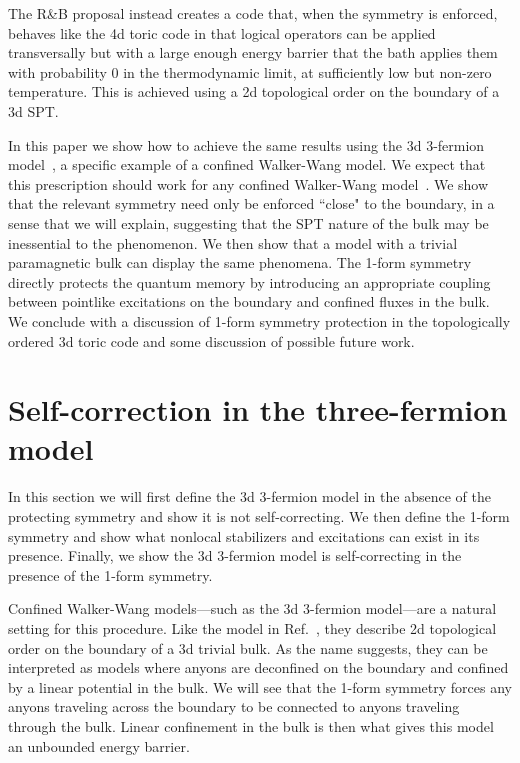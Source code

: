 \documentclass[twocolumn, longbibliography]{revtex4-2}
\begin{document}
The R\&B proposal \cite{RobertsBartlett} instead creates a code that, when the symmetry is enforced, behaves like the 4d toric code in that logical operators can be applied transversally but with a large enough energy barrier that the bath applies them with probability 0 in the thermodynamic limit, at sufficiently low but non-zero temperature. This is achieved using a 2d topological order on the boundary of a 3d SPT. 
	
In this paper we show how to achieve the same results using the 3d 3-fermion model~\cite{BurnellSoluble}, a specific example of a confined Walker-Wang model. We expect that this prescription should work for any confined Walker-Wang model~\cite{WalkerWang, vonKeyserlingkSurfaceAnyons}. We show that the relevant symmetry need only be enforced ``close" to the boundary, in a sense that we will explain, suggesting that the SPT nature of the bulk may be inessential to the phenomenon. 
We then show that a model with a trivial paramagnetic bulk can display the same phenomena. The 1-form symmetry directly protects the quantum memory by introducing an appropriate coupling between pointlike excitations on the boundary and confined fluxes in the bulk. 
We conclude with a discussion of 1-form symmetry protection in the topologically ordered 3d toric code and some discussion of possible future work.

\section{Self-correction in the three-fermion model}
	
In this section we will first define the 3d 3-fermion model in the absence of the protecting symmetry and show it is not self-correcting. We then define the 1-form symmetry and show what nonlocal stabilizers and excitations can exist in its presence. Finally, we show the 3d 3-fermion model is self-correcting in the presence of the 1-form symmetry.

Confined Walker-Wang models---such as the 3d 3-fermion model---are a natural setting for this procedure. Like the model in Ref.~\cite{RobertsBartlett}, they describe 2d topological order on the boundary of a 3d trivial bulk. As the name suggests, they can be interpreted as models where anyons are deconfined on the boundary and confined by a linear potential in the bulk. We will see that the 1-form symmetry forces any anyons traveling across the boundary to be connected to anyons traveling through the bulk. Linear confinement in the bulk is then what gives this model an unbounded energy barrier.
	
\end{document}
